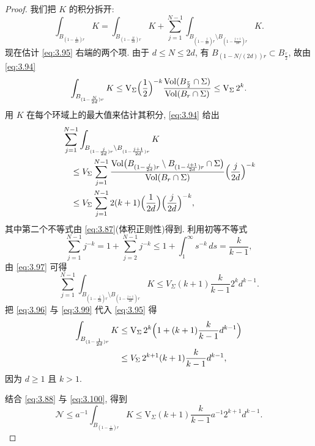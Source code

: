 \begin{proof}
我们把 $K$ 的积分拆开:
\begin{equation}
\int_{B_{(1-\frac{1}{2d})r}}K
 =\int_{B_{(1-\frac{N}{2d})r}}K
 +\sum_{j=1}^{N-1}\int_{B_{(1-\frac{j}{2d})r}\setminus
 B_{(1-\frac{j+1}{2d})r}}K.
\label{eq:3.95}
\end{equation}
现在估计 \eqref{eq:3.95} 右端的两个项. 由于 $d\leq N\leq2d$, 有
$B_{(1-N/(2d))r}\subset B_{\frac r2}$, 故由 \eqref{eq:3.94}
\begin{equation}
\int_{B_{(1-\frac{N}{2d})r}}K
 \leq\mathrm{V}_\Sigma\Bigl(\frac12\Bigr)^{-k}
 \frac{\operatorname{Vol}(B_{\frac r2}\cap\Sigma)}{\operatorname{Vol}(B_r\cap\Sigma)}
 \leq\mathrm{V}_\Sigma\,2^k.
\label{eq:3.96}
\end{equation}
用 $K$ 在每个环域上的最大值来估计其积分, \eqref{eq:3.94} 给出
\begin{equation}
\begin{aligned}
&\sum_{j=1}^{N-1}\int_{B_{(1-\frac{j}{2d})r}\setminus
 B_{(1-\frac{j+1}{2d})r}}K\\
&\quad\leq V_\Sigma\sum_{j=1}^{N-1}
 \frac{\operatorname{Vol}\bigl(B_{(1-\frac{j}{2d})r}\setminus
 B_{(1-\frac{j+1}{2d})r}\cap\Sigma\bigr)}{\operatorname{Vol}(B_r\cap\Sigma)}
 \Bigl(\frac{j}{2d}\Bigr)^{-k}\\
&\quad\leq V_\Sigma\sum_{j=1}^{N-1}2(k+1)
 \Bigl(\frac{1}{2d}\Bigr)\Bigl(\frac{j}{2d}\Bigr)^{-k},
\end{aligned}
\label{eq:3.97}
\end{equation}
其中第二个不等式由 \eqref{eq:3.87}(体积正则性)得到. 利用初等不等式
\begin{equation}
\sum_{j=1}^{N-1}j^{-k}=1+\sum_{j=2}^{N-1}j^{-k}
 \leq1+\int_1^\infty s^{-k}\,ds=\frac{k}{k-1},
\label{eq:3.98}
\end{equation}
由 \eqref{eq:3.97} 可得
\begin{equation}
\sum_{j=1}^{N-1}\int_{B_{(1-\frac{j}{2d})r}\setminus
 B_{(1-\frac{j+1}{2d})r}}K
 \leq V_\Sigma(k+1)\frac{k}{k-1}2^k d^{k-1}.
\label{eq:3.99}
\end{equation}
把 \eqref{eq:3.96} 与 \eqref{eq:3.99} 代入 \eqref{eq:3.95} 得
\begin{equation}
\begin{aligned}
\int_{B_{(1-\frac{1}{2d})r}}K
&\leq\mathrm{V}_\Sigma\,2^k
 \Bigl(1+(k+1)\frac{k}{k-1}d^{k-1}\Bigr)\\
&\leq V_\Sigma\,2^{k+1}(k+1)\frac{k}{k-1}d^{k-1},
\end{aligned}
\label{eq:3.100}
\end{equation}
因为 $d\geq1$ 且 $k>1$.

结合 \eqref{eq:3.88} 与 \eqref{eq:3.100}, 得到
\begin{equation}
\mathcal{N}\leq a^{-1}\int_{B_{(1-\frac{1}{2d})r}}K
 \leq\mathrm{V}_\Sigma(k+1)\frac{k}{k-1}a^{-1}2^{k+1}d^{k-1}.
\label{eq:3.101}
\end{equation}
\end{proof}

